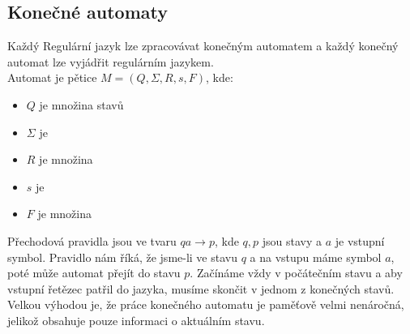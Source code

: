 \subsection{Konečné automaty}
Každý Regulární jazyk lze zpracovávat konečným automatem a každý konečný automat
lze vyjádřit regulárním jazykem.\\

Automat je pětice $M = (Q, \Sigma, R, s, F)$, kde:
\begin{itemize}
  \item $Q$ je množina stavů
  \item $\Sigma$ je 
  \item $R$ je množina 
  \item $s$ je 
  \item $F$ je množina 
\end{itemize}

Přechodová pravidla jsou ve tvaru $qa \rightarrow p$, kde $q, p$ jsou stavy a
$a$ je vstupní symbol. Pravidlo nám říká, že jsme-li ve stavu $q$ a na vstupu
máme symbol $a$, poté může automat přejít do stavu $p$.
Začínáme vždy v počátečním stavu a aby vstupní řetězec patřil do jazyka,
musíme skončit v jednom z konečných stavů.
Velkou výhodou je, že práce konečného automatu je paměťově velmi nenáročná, jelikož obsahuje pouze informaci o aktuálním
stavu.

